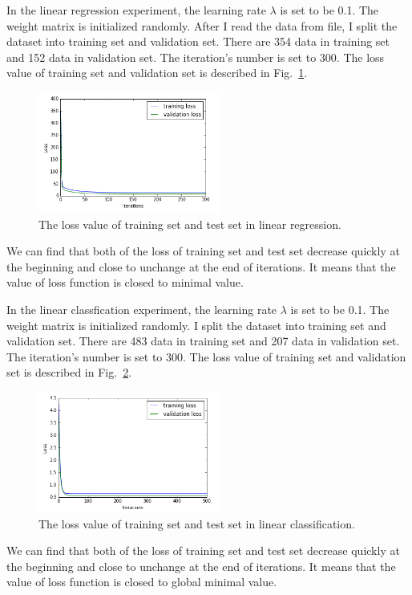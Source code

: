 \documentclass[journal, a4paper]{IEEEtran}
\begin{document}
In the linear regression experiment, the learning rate $\lambda$ is set to be 0.1. The weight matrix is initialized randomly. After I read the data from file, I split the dataset into training set and validation set. There are 354 data in training set and 152 data in validation set. The iteration's number is set to 300. The loss value of training set and validation set is described in Fig.~\ref{fig_1}.
\begin{figure}[htbp]
\centerline{\includegraphics[height=150px]{line_1.png}}
\caption{The loss value of training set and test set in linear regression.}
\label{fig_1}
\end{figure}

We can find that both of the loss of training set and test set decrease quickly at the beginning and close to unchange at the end of iterations. It means that the value of loss function is closed to minimal value.

In the linear classfication experiment, the learning rate $\lambda$ is set to be 0.1. The weight matrix is initialized randomly. I split the dataset into training set and validation set. There are 483 data in training set and 207 data in validation set. The iteration's number is set to 300. The loss value of training set and validation set is described in Fig.~\ref{fig_2}.

\begin{figure}[htbp]
\centerline{\includegraphics[height=150px]{line_2.png}}
\caption{The loss value of training set and test set in linear classification.}
\label{fig_2}
\end{figure}

We can find that both of the loss of training set and test set decrease quickly at the beginning and close to unchange at the end of iterations. It means that the value of loss function is closed to global minimal value.
\end{document}
